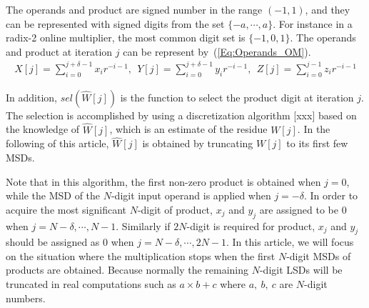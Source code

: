 \documentclass[a4paper, 11pt]{article}
\begin{document}
 The operands and product are signed number in the range $(-1,1)$, and they can be represented with signed digits from the set $\{-a,\cdots,a\}$. For instance in a radix-2 online multiplier, the most common digit set is $\{-1,0,1\}$. The operands and product at iteration $j$ can be represent by~(\ref{Eq:Operands_OM}).
\begin{eqnarray}\label{Eq:Operands_OM}
  X[j]=\sum_{i=0}^{j+\delta-1}x_ir^{-i-1},~~Y[j]=\sum_{i=0}^{j+\delta-1}y_ir^{-i-1},~~Z[j]=\sum_{i=0}^{j-1}z_ir^{-i-1}
\end{eqnarray}

In addition, $sel(\widehat{W}[j])$ is the function to select the product digit at iteration $j$. The selection is accomplished by using a discretization algorithm [xxx] based on the knowledge of $\widehat{W}[j]$, which is an estimate of the residue $W[j]$. In the following of this article, $\widehat{W}[j]$ is obtained by truncating $W[j]$ to its first few MSDs.

Note that in this algorithm, the first non-zero product is obtained when $j=0$, while the MSD of the $N$-digit input operand is applied when $j=-\delta$. In order to acquire the most significant $N$-digit of product, $x_j$ and $y_j$ are assigned to be $0$ when $j=N-\delta,\cdots,N-1$. Similarly if $2N$-digit is required for product, $x_j$ and $y_j$ should be assigned as $0$ when $j=N-\delta,\cdots,2N-1$. In this article, we will focus on the situation where the multiplication stops when the first $N$-digit MSDs of products are obtained. Because normally the remaining $N$-digit LSDs will be truncated in real computations such as $a\times b+c$ where $a,~b,~c$ are $N$-digit numbers.



\end{document}
